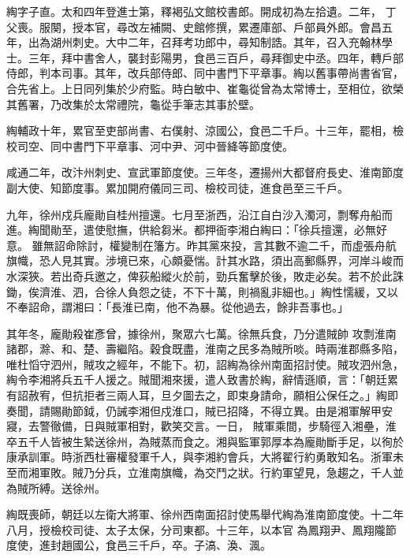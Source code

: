 \begin{pinyinscope}
 綯字子直。太和四年登進士第，釋褐弘文館校書郎。開成初為左拾遺。二年，
 丁父喪。服闋，授本官，尋改左補闕、史館修撰，累遷庫部、戶部員外郎。會昌五年，出為湖州刺史。大中二年，召拜考功郎中，尋知制誥。其年，召入充翰林學士。三年，拜中書舍人，襲封彭陽男，食邑三百戶，尋拜御史中丞。四年，轉戶部侍郎，判本司事。其年，改兵部侍郎、同中書門下平章事。綯以舊事帶尚書省官，合先省上。上日同列集於少府監。時白敏中、崔龜從曾為太常博士，至相位，欲榮其舊署，乃改集於太常禮院，龜從手筆志其事於壁。



 綯輔政十年，累官至吏部尚書、右僕射、涼國公，食邑二千戶。十三年，罷相，檢校司空、同中書門下平章事、河中尹、河中晉絳等節度使。



 咸通二年，改汴州刺史、宣武軍節度使。三年冬，遷揚州大都督府長史、淮南節度副大使、知節度事。累加開府儀同三司、檢校司徒，進食邑至三千戶。



 九年，徐州戍兵龐勛自桂州擅還。七月至浙西，沿江自白沙入濁河，剽奪舟船而進。綯聞勛至，遣使慰撫，供給芻米。都押衙李湘白綯曰：「徐兵擅還，必無好意。
 雖無詔命除討，權變制在籓方。昨其黨來投，言其數不逾二千，而虛張舟航旗幟，恐人見其實。涉境已來，心頗憂惴。計其水路，須出高郵縣界，河岸斗峻而水深狹。若出奇兵邀之，俾荻船縱火於前，勁兵奮擊於後，敗走必矣。若不於此誅鋤，俟濟淮、泗，合徐人負怨之徒，不下十萬，則禍亂非細也。」綯性懦緩，又以不奉詔命，謂湘曰：「長淮已南，他不為暴。從他過去，餘非吾事也。」



 其年冬，龐勛殺崔彥曾，據徐州，聚眾六七萬。徐無兵食，乃分遣賊帥
 攻剽淮南諸郡，滁、和、楚、壽繼陷。穀食既盡，淮南之民多為賊所啖。時兩淮郡縣多陷，唯杜慆守泗州，賊攻之經年，不能下。初，詔綯為徐州南面招討使。賊攻泗州急，綯令李湘將兵五千人援之。賊聞湘來援，遣人致書於綯，辭情遜順，言：「朝廷累有詔赦宥，但抗拒者三兩人耳，旦夕圖去之，即束身請命，願相公保任之。」綯即奏聞，請賜勛節鉞，仍誡李湘但戍淮口，賊已招降，不得立異。由是湘軍解甲安寢，去警徹備，日與賊軍相對，歡笑交言。一日，
 賊軍乘間，步騎徑入湘壘，淮卒五千人皆被生縶送徐州，為賊蒸而食之。湘與監軍郭厚本為龐勛斷手足，以徇於康承訓軍。時浙西杜審權發軍千人，與李湘約會兵，大將翟行約勇敢知名。浙軍未至而湘軍敗。賊乃分兵，立淮南旗幟，為交鬥之狀。行約軍望見，急趨之，千人並為賊所縛。送徐州。



 綯既喪師，朝廷以左衛大將軍、徐州西南面招討使馬舉代綯為淮南節度使。十二年八月，授檢校司徒、太子太保，分司東都。十三年，以本官
 為鳳翔尹、鳳翔隴節度使，進封趙國公，食邑三千戶，卒。子滈、渙、渢。




\end{pinyinscope}
